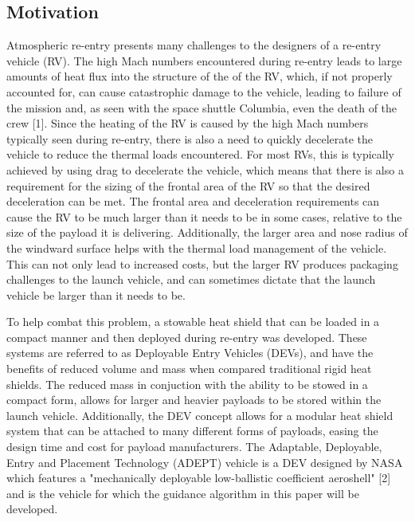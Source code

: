 \documentclass[12pt]{article}
\numberwithin{equation}{section}
\numberwithin{figure}{section}
\numberwithin{table}{section}
\begin{document}
\subsection{Motivation}
 Atmospheric re-entry presents many challenges to the designers of a re-entry vehicle (RV). The high Mach numbers encountered during re-entry leads to large amounts of heat flux into the structure of the of the RV, which, if not properly accounted for, can cause catastrophic damage to the vehicle, leading to failure of the mission and, as seen with the space shuttle Columbia, even the death of the crew [1]. Since the heating of the RV is caused by the high Mach numbers typically seen during re-entry, there is also a need to quickly decelerate the vehicle to reduce the thermal loads encountered. For most RVs, this is typically achieved by using drag to decelerate the vehicle, which means that there is also a requirement for the sizing of the frontal area of the RV so that the desired deceleration can be met. The frontal area and deceleration requirements can cause the RV to be much larger than it needs to be in some cases, relative to the size of the payload it is delivering. Additionally, the larger area and nose radius of the windward surface helps with the thermal load management of the vehicle. This can not only lead to increased costs, but the larger RV produces packaging challenges to the launch vehicle, and can sometimes dictate that the launch vehicle be larger than it needs to be.

To help combat this problem, a stowable heat shield that can be loaded in a compact manner and then deployed during re-entry was developed. These systems are referred to as Deployable Entry Vehicles (DEVs), and have the benefits of reduced volume and mass when compared traditional rigid heat shields. The reduced mass in conjuction with the ability to be stowed in a compact form, allows for larger and heavier payloads to be stored within the launch vehicle. Additionally, the DEV concept allows for a modular heat shield system that can be attached to many different forms of payloads, easing the design time and cost for payload manufacturers. The Adaptable, Deployable, Entry and Placement Technology (ADEPT) vehicle is a DEV designed by NASA which features a "mechanically deployable low-ballistic coefficient aeroshell" [2] and is the vehicle for which the guidance algorithm in this paper will be developed.
\end{document}
